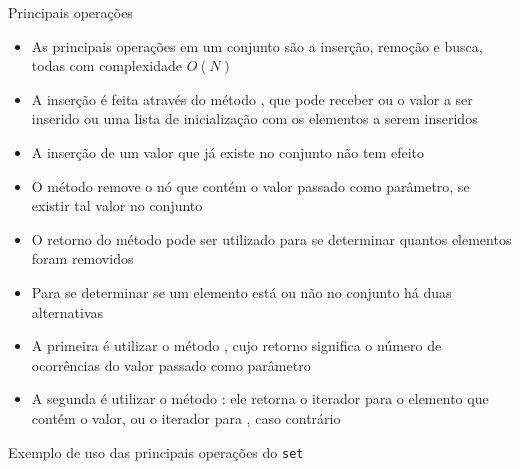 \begin{frame}[fragile]{Principais operações}

    \begin{itemize}
        \item As principais operações em um conjunto são a inserção, remoção e busca,
        todas com complexidade $O(N)$

        \item A inserção é feita através do método , que pode receber ou o
            valor a ser inserido ou uma lista de inicialização com os elementos a serem
            inseridos

        \item A inserção de um valor que já existe no conjunto não tem efeito

        \item O método  remove o nó que contém o valor passado como parâmetro,
            se existir tal valor no conjunto

        \item O retorno do método pode ser utilizado para se determinar quantos elementos foram
            removidos

        \item Para se determinar se um elemento está ou não no conjunto há duas alternativas

        \item A primeira é utilizar o método , cujo retorno significa o número
            de ocorrências do valor passado como parâmetro

        \item A segunda é utilizar o método : ele retorna o iterador para o
            elemento que contém o valor, ou o iterador para , caso contrário
    \end{itemize}

\end{frame}

\begin{frame}[fragile]{Exemplo de uso das principais operações do \texttt{set}}
\end{frame}

